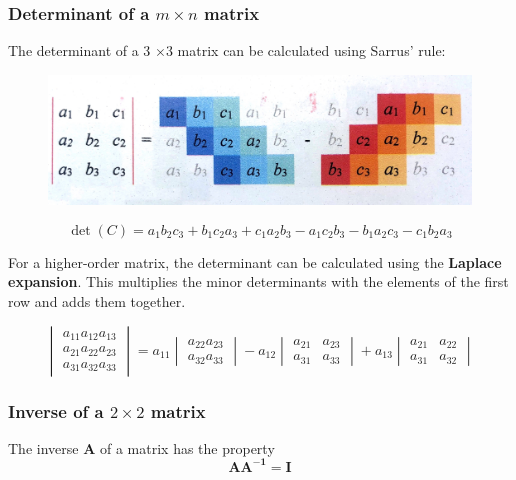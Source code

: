 \subsubsection{Determinant of a \texorpdfstring{\( m \times n \)}{2 by 2} matrix}
The determinant of a 3 \(\times \)3 matrix can be calculated using Sarrus' rule:
\begin{figure}[H]
	\centering
	\includegraphics[width=15cm]{Sarrus}
\end{figure}

\begin{equation}
	\det(C) =a_{1} b_{2} c_{3}+b_{1} c_{2} a_{3}+c_{1} a_{2} b_{3}-a_{1} c_{2} b_{3}-b_{1} a_{2} c_{3}-c_{1} b_{2} a_{3}
\end{equation}

For a higher-order matrix, the determinant can be calculated using the \textbf{Laplace expansion}. This multiplies the minor determinants with the elements of the first row and adds them together.

\begin{equation}
		\begin{vmatrix}
			{a_{11} a_{12} a_{13}} \\ {a_{21} a_{22} a_{23}} \\ {a_{31} a_{32} a_{33}}
		\end{vmatrix}
		=a_{11}
		\begin{vmatrix}
			{a_{22} a_{23}} \\ {a_{32} a_{33}}
		\end{vmatrix}
		- 	a_{12}
		\begin{vmatrix}
			{a_{21}} & {a_{23}} \\ {a_{31}} & {a_{33}}
		\end{vmatrix}
		+ a_{13}
		\begin{vmatrix}
			{a_{21}} & {a_{22}} \\ {a_{31}} & {a_{32}}
		\end{vmatrix}
\end{equation}


\subsubsection{Inverse of a \texorpdfstring{\( 2 \times 2 \)}{2 by 2} matrix}
The inverse \( \mathbf{A} \) of a matrix has the property
\begin{equation}
	\mathbf{AA^{-1}} = \mathbf{I}
\end{equation}

